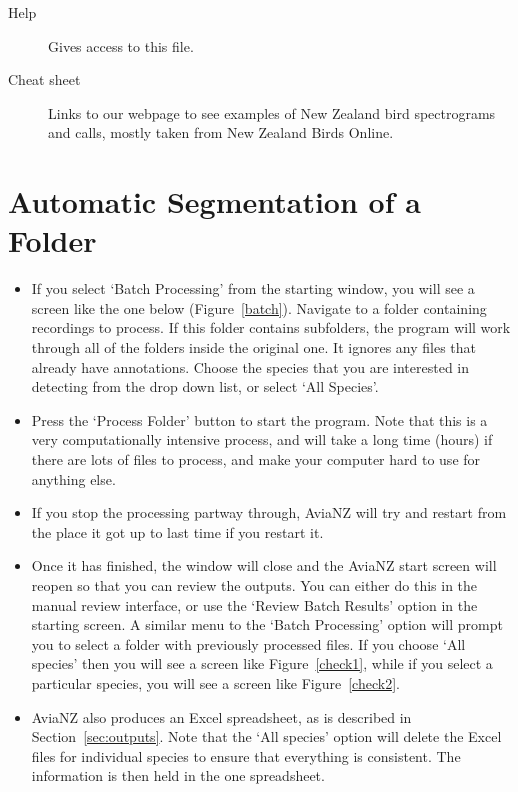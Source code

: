 \documentclass{article}
\begin{document}
\begin{description}
\item [Help] Gives access to this file.
\item [Cheat sheet] Links to our webpage to see examples of New Zealand bird spectrograms and calls, mostly taken from New Zealand Birds Online.
\end{description}


\section{Automatic Segmentation of a Folder}
\label{sec:auto}

\begin{itemize}
\item If you select `Batch Processing' from the starting window, you will see a screen like the one below (Figure~\ref{batch}). Navigate to a folder containing recordings to process. If this folder contains subfolders, the program will work through all of the folders inside the original one. It ignores any files that already have annotations. Choose the species that you are interested in detecting from the drop down list, or select `All Species'. 

\item Press the `Process Folder' button to start the program. Note that this is a very computationally intensive process, and will take a long time (hours) if there are lots of files to process, and make your computer hard to use for anything else. 

\item If you stop the processing partway through, AviaNZ will try and restart from the place it got up to last time if you restart it.

\item Once it has finished, the window will close and the AviaNZ start screen will reopen so that you can review the outputs. You can either do this in the manual review interface, or use the `Review Batch Results' option in the starting screen. A similar menu to the `Batch Processing' option will prompt you to select a folder with previously processed files. If you choose `All species' then you will see a screen like Figure~\ref{check1}, while if you select a particular species, you will see a screen like Figure~\ref{check2}. 

\item AviaNZ also produces an Excel spreadsheet, as is described in Section~\ref{sec:outputs}. Note that the `All species' option will delete the Excel files for individual species to ensure that everything is consistent. The information is then held in the one spreadsheet.  
\end{itemize}
	
\end{document}
